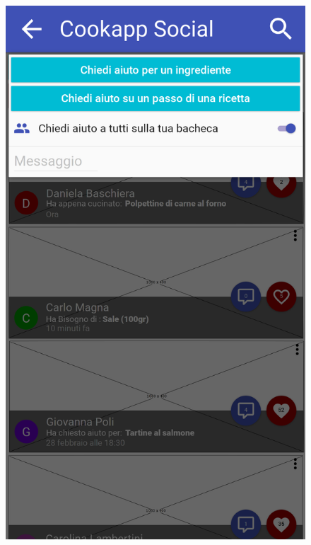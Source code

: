 \begin{figure}[H]
	\begin{minipage}{.49\textwidth}
		\includegraphics[width=\textwidth]{img/wireframe/chiedi_aiuto_social_a_tutti.png}
	\end{minipage}
	\begin{minipage}{.49\textwidth}

\end{minipage}
\end{figure}
